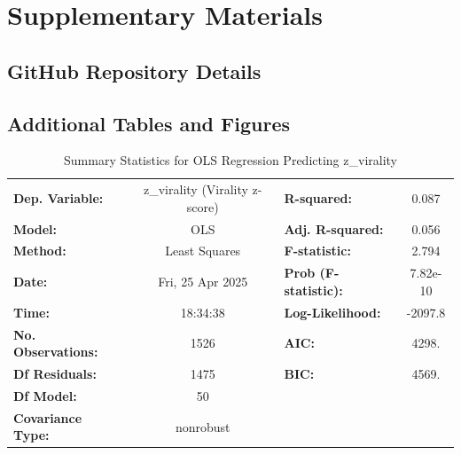 \documentclass[12pt,a4paper]{report}
\begin{document}


\chapter{Supplementary Materials}
\section{GitHub Repository Details}
\section{Additional Tables and Figures}

\begin{table}
    \centering
    \captionsetup{justification=centering}
    \caption{Summary Statistics for OLS Regression Predicting z\_virality}
    \label{tab:ols_virality_summary}
    \scriptsize %
    \setlength{\tabcolsep}{3pt} %

    \begin{tabular}{lclc}
        \toprule
        \textbf{Dep. Variable:}     & z\_virality (Virality z-score) & \textbf{R-squared:}         & 0.087   \\
        \textbf{Model:}             & OLS                            & \textbf{Adj. R-squared:}    & 0.056   \\
        \textbf{Method:}            & Least Squares                  & \textbf{F-statistic:}       & 2.794   \\
        \textbf{Date:}              & Fri, 25 Apr 2025               & \textbf{Prob (F-statistic):} & 7.82e-10 \\
        \textbf{Time:}              & 18:34:38                       & \textbf{Log-Likelihood:}    & -2097.8 \\
        \textbf{No. Observations:}  & 1526                           & \textbf{AIC:}               & 4298.   \\
        \textbf{Df Residuals:}      & 1475                           & \textbf{BIC:}               & 4569.   \\
        \textbf{Df Model:}          & 50                             & \textbf{}                   &         \\
        \textbf{Covariance Type:}   & nonrobust                      & \textbf{}                   &         \\
        \bottomrule
    \end{tabular}
\end{table}
\end{document}

